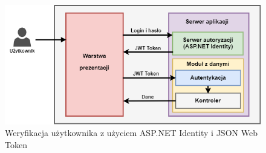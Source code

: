     
    \begin{figure}[ht]
	\centering
	\includegraphics[width=1\linewidth]{graphics/jwt-identity-diagram.png}
	\caption{Weryfikacja użytkownika z użyciem ASP.NET Identity i JSON Web Token}
	\label{fig:jwt-identity-diagram}
    \end{figure}




